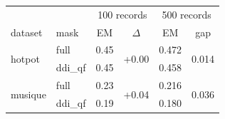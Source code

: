\begin{tabular}{llcc cc}
\toprule
 & & \multicolumn{2}{c}{100 records} & \multicolumn{2}{c}{500 records} \\
dataset & mask & EM & $\Delta$ & EM & gap \\
\midrule
\multirow{2}{*}{hotpot} & full & 0.45 & \multirow{2}{*}{+0.00} & 0.472 & \multirow{2}{*}{0.014} \\
 & ddi\_qf & 0.45 & & 0.458 & \\
\midrule
\multirow{2}{*}{musique} & full & 0.23 & \multirow{2}{*}{+0.04} & 0.216 & \multirow{2}{*}{0.036} \\
 & ddi\_qf & 0.19 & & 0.180 & \\
\bottomrule
\end{tabular}
